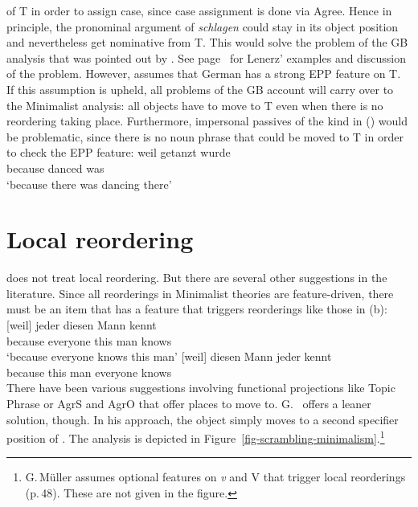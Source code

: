 of T in order to assign case, since case assignment is done via Agree. Hence in principle, the pronominal argument
of \emph{schlagen} could stay in its object position and nevertheless get nominative
from T. This would solve the problem of the GB analysis that was pointed out by \citet[Section~4.4.3]{Lenerz77}. See
page~\pageref{ex-passive-German-no-movement} for Lenerz' examples and discussion of the
problem.
However, \citet[]{Adger2003a} assumes that German has a strong EPP feature on T. If this
assumption is upheld, all problems of the GB account will carry over to the Minimalist analysis: all
objects have to move to T even when there is no reordering taking place. Furthermore, impersonal
passives of the kind in () would be problematic, since there is no noun phrase that could be
moved to T in order to check the EPP feature:
\ea
\gll weil getanzt wurde\\
     because danced was\\
\glt `because there was dancing there'
\z
{}

\section{Local reordering}

\citet{Adger2003a} does not treat local reordering. But there are several other suggestions in the
literature. Since all reorderings in Minimalist theories are feature-driven, there must be an item
that has a feature that triggers reorderings like those in (b):
\eal
\ex 
\gll {}[weil] jeder diesen Mann kennt\\
	 {}\spacebr{}because everyone this man knows\\
\glt `because everyone knows this man'
\ex 
\gll {}[weil] diesen Mann jeder kennt\\
	 {}\spacebr{}because this man everyone knows\\
\zl
There have been various suggestions involving functional projections like Topic Phrase \citep[]{Laenzlinger2004a} or AgrS and
AgrO \citep[Chapter~4]{Meinunger2000a} that offer places to move to. G.\ \citet[Section~3.5]{GMueller2014a-u} offers a leaner solution, though. In his approach, the
object simply moves to a second specifier position of \littlev. The analysis is depicted in
Figure~\vref{fig-scrambling-minimalism}.\footnote{%
  G.\,Müller assumes optional features on \textit{v} and V that trigger local reorderings (p.\,48). These are not
  given in the figure.
} 

